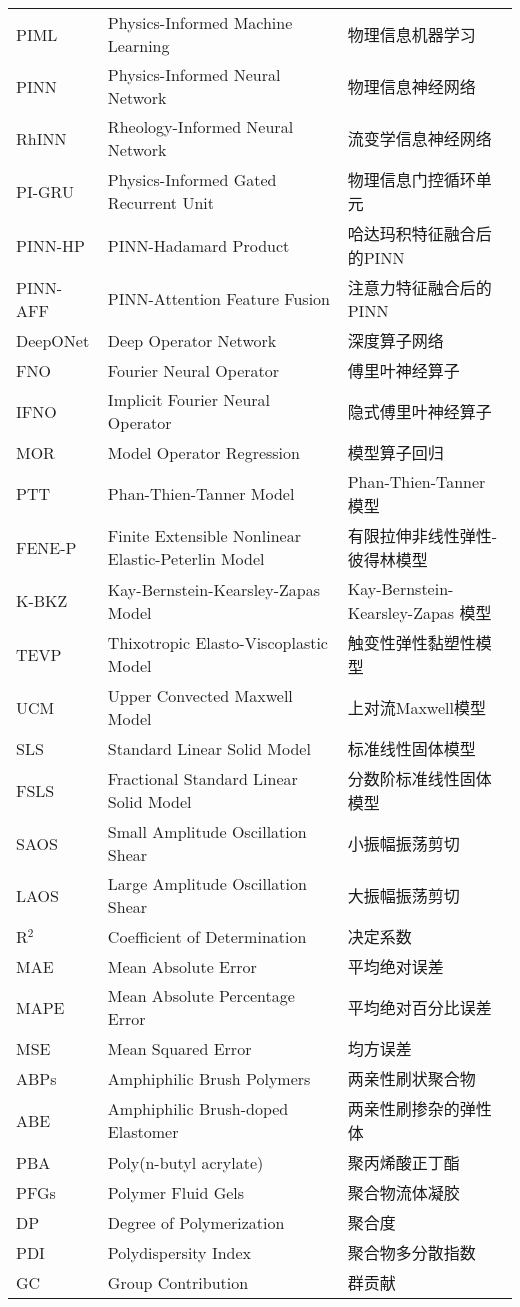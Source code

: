 \begin{longtable}{lll}
	PIML     & Physics-Informed Machine Learning                  & 物理信息机器学习\tabularnewline
	PINN     & Physics-Informed Neural Network                    & 物理信息神经网络\tabularnewline
	RhINN    & Rheology-Informed Neural Network                   & 流变学信息神经网络\tabularnewline
	PI-GRU   & Physics-Informed Gated Recurrent Unit              & 物理信息门控循环单元\tabularnewline
	PINN-HP  & PINN-Hadamard Product                              & 哈达玛积特征融合后的PINN\tabularnewline
	PINN-AFF & PINN-Attention Feature Fusion                      & 注意力特征融合后的PINN\tabularnewline

	DeepONet & Deep Operator Network                              & 深度算子网络\tabularnewline
	FNO      & Fourier Neural Operator                            & 傅里叶神经算子\tabularnewline
	IFNO     & Implicit Fourier Neural Operator                   & 隐式傅里叶神经算子\tabularnewline
	MOR      & Model Operator Regression                          & 模型算子回归\tabularnewline

	PTT      & Phan-Thien-Tanner Model                            & Phan-Thien-Tanner 模型\tabularnewline
	FENE-P   & Finite Extensible Nonlinear Elastic-Peterlin Model & 有限拉伸非线性弹性-彼得林模型\tabularnewline
	K-BKZ    & Kay-Bernstein-Kearsley-Zapas Model                 & Kay-Bernstein-Kearsley-Zapas 模型\tabularnewline
	TEVP     & Thixotropic Elasto-Viscoplastic Model              & 触变性弹性黏塑性模型\tabularnewline
	UCM      & Upper Convected Maxwell Model                      & 上对流Maxwell模型\tabularnewline
	SLS      & Standard Linear Solid Model                        & 标准线性固体模型\tabularnewline
	FSLS     & Fractional Standard Linear Solid Model             & 分数阶标准线性固体模型\tabularnewline

	SAOS     & Small Amplitude Oscillation Shear                  & 小振幅振荡剪切\tabularnewline
	LAOS     & Large Amplitude Oscillation Shear                  & 大振幅振荡剪切\tabularnewline

	R$^2$    & Coefficient of Determination                       & 决定系数\tabularnewline
	MAE      & Mean Absolute Error                                & 平均绝对误差\tabularnewline
	MAPE     & Mean Absolute Percentage Error                     & 平均绝对百分比误差\tabularnewline
	MSE      & Mean Squared Error                                 & 均方误差\tabularnewline

	ABPs     & Amphiphilic Brush Polymers                         & 两亲性刷状聚合物\tabularnewline
	ABE      & Amphiphilic Brush-doped Elastomer                  & 两亲性刷掺杂的弹性体\tabularnewline
	PBA      & Poly(n-butyl acrylate)                             & 聚丙烯酸正丁酯\tabularnewline
	PFGs     & Polymer Fluid Gels                                 & 聚合物流体凝胶\tabularnewline
	DP       & Degree of Polymerization                           & 聚合度\tabularnewline
	PDI      & Polydispersity Index                               & 聚合物多分散指数\tabularnewline
	GC       & Group Contribution                                 & 群贡献\tabularnewline


\end{longtable}
